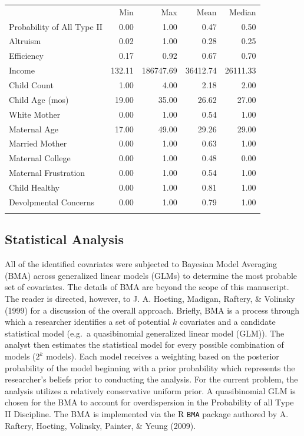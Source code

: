 \documentclass[]{elsarticle}
\let\footnote=\endnote
\begin{document}
\begin{longtable}[c]{@{}lrrrr@{}}
\toprule\addlinespace
& Min & Max & Mean & Median
\\\addlinespace
\midrule\endhead
Probability of All Type II & 0.00 & 1.00 & 0.47 & 0.50
\\\addlinespace
Altruism & 0.02 & 1.00 & 0.28 & 0.25
\\\addlinespace
Efficiency\footnote{Ibid.} & 0.17 & 0.92 & 0.67 & 0.70
\\\addlinespace
Income & 132.11 & 186747.69 & 36412.74 & 26111.33
\\\addlinespace
Child Count & 1.00 & 4.00 & 2.18 & 2.00
\\\addlinespace
Child Age (mos) & 19.00 & 35.00 & 26.62 & 27.00
\\\addlinespace
White Mother & 0.00 & 1.00 & 0.54 & 1.00
\\\addlinespace
Maternal Age & 17.00 & 49.00 & 29.26 & 29.00
\\\addlinespace
Married Mother & 0.00 & 1.00 & 0.63 & 1.00
\\\addlinespace
Maternal College & 0.00 & 1.00 & 0.48 & 0.00
\\\addlinespace
Maternal Frustration & 0.00 & 1.00 & 0.54 & 1.00
\\\addlinespace
Child Healthy & 0.00 & 1.00 & 0.81 & 1.00
\\\addlinespace
Devolpmental Concerns & 0.00 & 1.00 & 0.79 & 1.00
\\\addlinespace
\bottomrule
\end{longtable}

\subsection{Statistical Analysis}\label{statistical-analysis}

All of the identified covariates were subjected to Bayesian Model
Averaging (BMA) across generalized linear models (GLMs) to determine the
most probable set of covariates. The details of BMA are beyond the scope
of this manuscript. The reader is directed, however, to J. A. Hoeting,
Madigan, Raftery, \& Volinsky (1999) for a discussion of the overall
approach. Briefly, BMA is a process through which a researcher
identifies a set of potential $k$ covariates and a candidate statistical
model (e.g.~a quasibinomial generalized linear model (GLM)). The analyst
then estimates the statistical model for every possible combination of
models ($2^k$ models). Each model receives a weighting based on the
posterior probability of the model beginning with a prior probability
which represents the researcher's beliefs prior to conducting the
analysis. For the current problem, the analysis utilizes a relatively
conservative uniform prior. A quasibinomial GLM is chosen for the BMA to
account for overdispersion in the Probability of all Type II Discipline.
The BMA is implemented via the R \texttt{BMA} package authored by A.
Raftery, Hoeting, Volinsky, Painter, \& Yeung (2009).
\end{document}
